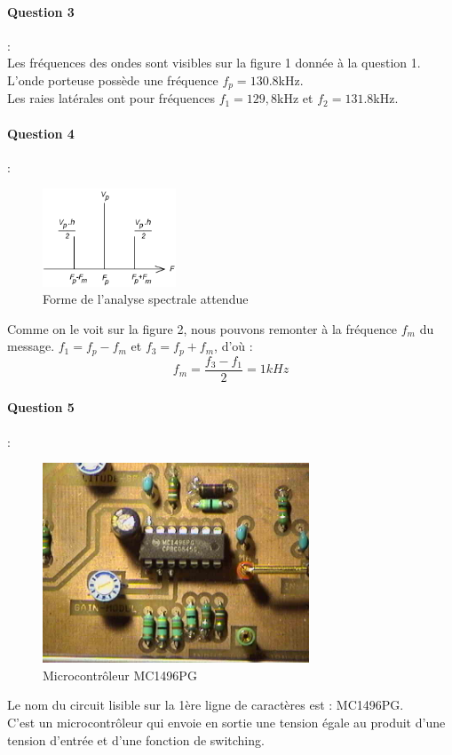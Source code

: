 \documentclass[french]{article}
\begin{document}
\paragraph{Question 3} : \\
Les fréquences des ondes sont visibles sur la figure 1 donnée à la question 1. \\
L'onde porteuse possède une fréquence $f_{p} = 130.8$kHz.  \\
Les raies latérales ont pour fréquences $f_{1}=129,8$kHz et $f_{2}=131.8$kHz.
\paragraph{Question 4} : \\
\begin{figure}[!h]
\begin{center}
 \includegraphics[width=150px]{DM2_fig2.png}
 \caption{Forme de l'analyse spectrale attendue}
 \end{center} 
 \end{figure}
Comme on le voit sur la figure 2, nous pouvons remonter à la fréquence $f_{m}$ du message.
$f_{1}=f_{p}-f_{m}$ et $f_{3}=f_{p}+f_{m}$, d'où :
\begin{equation*}
f_{m}=\frac{f_{3}-f_{1}}{2}=1kHz
\end{equation*}
\paragraph{Question 5} : \\
\begin{figure}[!h]
\begin{center}
\includegraphics[width=300px]{DM2_Q5.jpg} 
\caption{Microcontrôleur MC1496PG}
\end{center}
\end{figure}
Le nom du circuit lisible sur la 1ère ligne de caractères est : MC1496PG. \\
C’est un microcontrôleur qui envoie en sortie une tension égale au produit d’une tension d’entrée et d’une fonction de switching.
\end{document}
